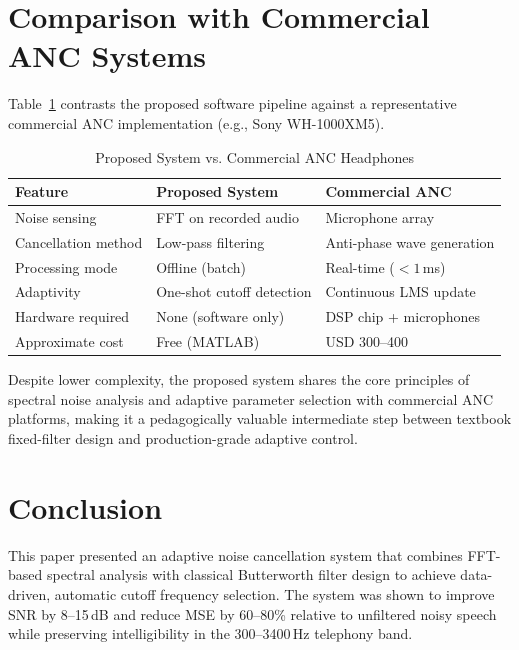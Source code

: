 \documentclass[conference]{IEEEtran}
\begin{document}
\section{Comparison with Commercial ANC Systems}

Table~\ref{tab:anc} contrasts the proposed software pipeline against a
representative commercial ANC implementation (e.g., Sony WH-1000XM5).

\begin{table}[htbp]
\caption{Proposed System vs. Commercial ANC Headphones}
\label{tab:anc}
\centering
\begin{tabular}{lll}
\toprule
\textbf{Feature}         & \textbf{Proposed System} & \textbf{Commercial ANC} \\
\midrule
Noise sensing            & FFT on recorded audio      & Microphone array \\
Cancellation method      & Low-pass filtering         & Anti-phase wave generation \\
Processing mode          & Offline (batch)            & Real-time ($<1$\,ms) \\
Adaptivity               & One-shot cutoff detection  & Continuous LMS update \\
Hardware required        & None (software only)       & DSP chip + microphones \\
Approximate cost         & Free (MATLAB)              & USD 300--400 \\
\bottomrule
\end{tabular}
\end{table}

Despite lower complexity, the proposed system shares the core principles of
spectral noise analysis and adaptive parameter selection with commercial ANC
platforms, making it a pedagogically valuable intermediate step between
textbook fixed-filter design and production-grade adaptive control.

\section{Conclusion}

This paper presented an adaptive noise cancellation system that combines
FFT-based spectral analysis with classical Butterworth filter design to
achieve data-driven, automatic cutoff frequency selection. The system was
shown to improve SNR by 8--15\,dB and reduce MSE by 60--80\% relative to
unfiltered noisy speech while preserving intelligibility in the 300--3400\,Hz
telephony band.
\end{document}
